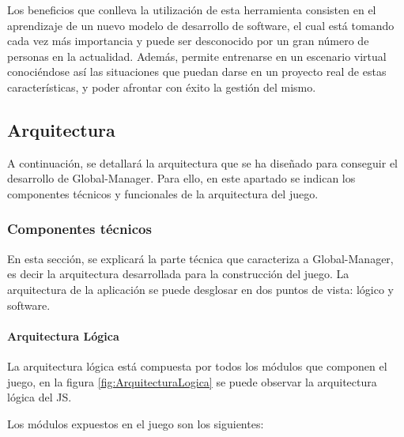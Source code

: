 Los beneficios que conlleva la utilización de esta herramienta consisten en el aprendizaje de un nuevo modelo de desarrollo de software, el cual está tomando cada vez más importancia y puede ser desconocido por un gran número de personas en la actualidad. Además, permite entrenarse en un escenario virtual conociéndose así las situaciones que puedan darse en un proyecto real de estas características, y poder afrontar con éxito la gestión del mismo.

\subsection{Arquitectura}
\label{sec:Arquitectura}

A continuación, se detallará la arquitectura que se ha diseñado para conseguir el desarrollo de Global-Manager. Para ello, en este apartado se indican los componentes técnicos y funcionales de la arquitectura del juego.

\subsubsection*{Componentes técnicos}
\label{sec:ComponentesTecnicos}

En esta sección, se explicará la parte técnica que caracteriza a Global-Manager, es decir la arquitectura desarrollada para la construcción del juego. La arquitectura de la aplicación se puede desglosar en dos puntos de vista: lógico y software.

\paragraph*{Arquitectura Lógica}

La arquitectura lógica está compuesta por todos los módulos que componen el juego, en la figura \ref{fig:ArquitecturaLogica} se puede observar la arquitectura lógica del JS.


Los módulos expuestos en el juego son los siguientes:

